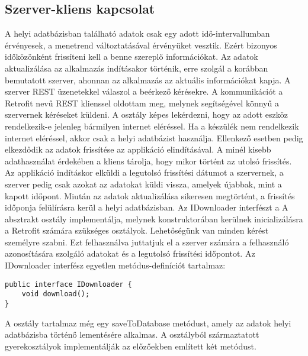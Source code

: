\subsection*{Szerver-kliens kapcsolat}
\label{serverclient}
A helyi adatbázisban található adatok csak egy adott idő-intervallumban érvényesek, a menetrend változtatásával érvényüket vesztik. 
Ezért bizonyos időközönként frissíteni kell a benne szereplő információkat. 
Az adatok aktualizálása az alkalmazás indításakor történik, erre szolgál a korábban bemutatott szerver, ahonnan az alkalmazás az aktuális információkat kapja.
A szerver REST üzenetekkel válaszol a beérkező kérésekre.
A kommunikációt a Retrofit nevű REST klienssel oldottam meg, melynek segítségével könnyű a szervernek kéréseket küldeni.
A  osztály képes lekérdezni, hogy az adott eszköz rendelkezik-e jelenleg bármilyen internet eléréssel. 
Ha a készülék nem rendelkezik internet eléréssel, akkor csak a helyi adatbázist használja.
Ellenkező esetben pedig elkezdődik az adatok frissítése az applikáció elindításával.
A minél kisebb adathasználat érdekében a kliens tárolja, hogy mikor történt az utolsó frissítés. 
Az applikáció indításkor elküldi a legutolsó frissítési dátumot a szervernek, a szerver pedig csak azokat az adatokat küldi vissza, amelyek újabbak, mint a kapott időpont.
Miután az adatok aktualizálása sikeresen megtörtént, a frissítés időponja felülírásra kerül a helyi adatbázisban.
Az IDownloader interfészt a A  absztrakt osztály implementálja, melynek konstruktorában kerülnek inicializálásra a Retrofit számára szükséges osztályok.
Lehetőségünk van minden kérést személyre szabni. 
Ezt felhasználva juttatjuk el a szerver számára a felhasználó azonosítására szolgáló adatokat és a legutolsó frissítési időpontot.
Az IDownloader interfész egyetlen metódus-definíciót tartalmaz:
\begin{lstlisting}
public interface IDownloader {
    void download();
}
\end{lstlisting}
A  osztály tartalmaz még egy saveToDatabase metódust, amely az adatok helyi adatbázisba történő lementésére alkalmas.
A  osztályból származtatott gyerekosztályok implementálják az előzőekben említett két metódust.

